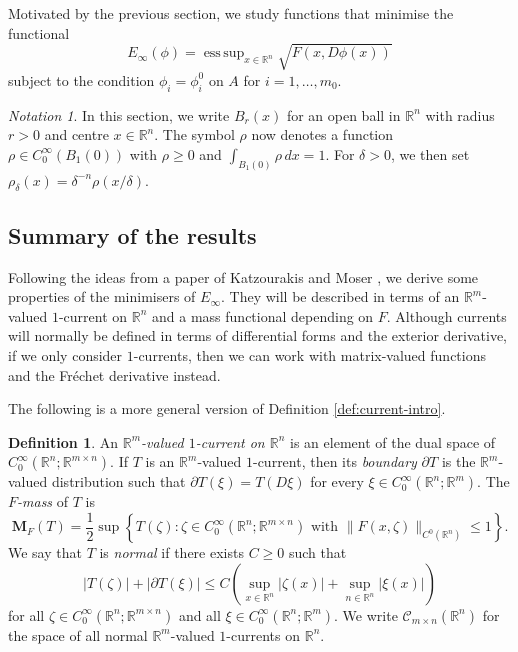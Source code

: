 \documentclass[a4paper]{article}
\newcommand{\R}{\mathbb{R}}
\newcommand{\M}{\mathbf{M}}
\newcommand{\ncrt}{\mathcal{C}}
\DeclareMathOperator*{\esssup}{ess \, sup}
\newcommand{\set}[2]{\left\{ #1 \colon #2 \right\}}
\theoremstyle{definition}
\newtheorem{definition}[theorem]{Definition}
\theoremstyle{remark}
\newtheorem*{notation}{Notation}{}
\begin{document}
Motivated by the previous section, we study functions that minimise the
functional
\[
E_\infty(\phi) = \esssup_{x \in \R^n} \sqrt{F(x, D\phi(x))}
\]
subject to the condition $\phi_i = \phi_i^0$ on $A$ for $i = 1, \dotsc, m_0$.

\begin{notation}
In this section, we write $B_r(x)$ for an open ball in $\R^n$ with radius $r > 0$ and centre $x \in \R^n$.
The symbol $\rho$ now denotes a function $\rho \in C_0^\infty(B_1(0))$ with $\rho \ge 0$ and
$\int_{B_1(0)} \rho \, dx = 1$. For $\delta > 0$, we then set $\rho_\delta(x) = \delta^{-n} \rho(x/\delta)$.
\end{notation}






\subsection{Summary of the results}

Following the ideas from a paper of Katzourakis and Moser \cite{Katzourakis-Moser:25}, we
derive some properties of the minimisers of $E_\infty$. They will be described in terms
of an $\R^m$-valued $1$-current on $\R^n$ and a mass functional depending
on $F$. Although currents will normally be defined in terms of differential
forms and the exterior derivative, if we only consider $1$-currents, then we
can work with matrix-valued functions and the Fr\'echet derivative instead.

The following is  a more general version of Definition \ref{def:current-intro}.

\begin{definition} \label{def:current}
An \emph{$\R^m$-valued $1$-current on $\R^n$} is an element of the dual space
of $C_0^\infty(\R^n; \R^{m \times n})$. If $T$ is an $\R^m$-valued
$1$-current, then its \emph{boundary} $\partial T$ is the $\R^m$-valued distribution such that $\partial T(\xi) = T(D\xi)$
for every $\xi \in C_0^\infty(\R^n; \R^m)$. The \emph{$F$-mass} of $T$
is
\[
\M_F(T) = \frac{1}{2} \sup\set{T(\zeta)}{\zeta \in C_0^\infty(\R^n; \R^{m \times n}) \text{ with } \|F(x, \zeta)\|_{C^0(\R^n)} \le 1}.
\]
We say that $T$ is \emph{normal} if there exists
$C \ge 0$ such that
\[
|T(\zeta)| + |\partial T(\xi)| \le C \left(\sup_{x \in \R^n} |\zeta(x)| + \sup_{n \in \R^n} |\xi(x)|\right)
\]
for all $\zeta \in C_0^\infty(\R^n; \R^{m \times n})$ and all $\xi \in C_0^\infty(\R^n; \R^m)$.
We write $\ncrt_{m \times n}(\R^n)$ for the space of all normal $\R^m$-valued $1$-currents on $\R^n$.
\end{definition}
\end{document}
